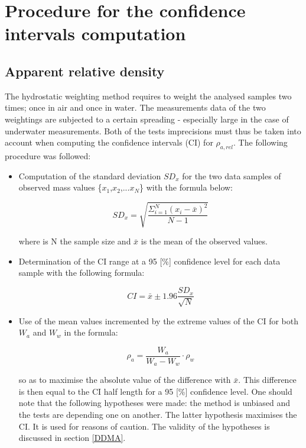 
\chapter{Procedure for the confidence intervals computation} %

\label{AppendixC} %

\section{Apparent relative density}

The hydrostatic weighting method requires to weight the analysed samples two times; once in air and once in water. The measurements data of the two weightings are subjected to a certain spreading - especially large in the case of underwater measurements. Both of the tests imprecisions must thus be taken into account when computing the confidence intervals (CI) for $\rho_{a,rel}$. The following procedure was followed:

\begin{itemize}
\item Computation of the standard deviation $SD_x$ for the two data samples of observed mass values \{$x_1$,$x_2$,...$x_N$\} with the formula below:

$$SD_x=\sqrt{\frac{\Sigma^N_{i=1}(x_i-\bar{x})^2}{N-1}} $$

where is N the sample size and $\bar{x}$ is the mean of the observed values.

\item Determination of the CI range at a 95 [\%] confidence level for each data sample with the following formula:

$$CI= \bar{x} \pm 1.96 \frac{SD_x}{\sqrt{N}}$$

\item Use of the mean values incremented by the extreme values of the CI for both $W_a$ and $W_w$ in the formula:


$$\rho_a=\frac{W_a}{W_a-W_w} \cdot \rho_w $$

so as to maximise the absolute value of the difference with $\bar{x}$. This difference is then equal to the CI half length for a 95 [\%] confidence level. One should note that the following hypotheses were made: the method is unbiased and the tests are depending one on another. The latter hypothesis maximises the CI. It is used for reasons of caution. The validity of the hypotheses is discussed in section \ref{DDMA}.
\end{itemize}

